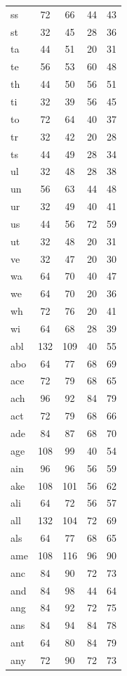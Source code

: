 \documentclass[ms,electronic,twosidetoc,letterpaper,chaptercenter,parttop,lof,lot]{byumsphd}
\begin{document}
\begin{longtable}{| l | c c | c c |}
  ss & 72 & 66 & 44 & 43 \\
  st & 32 & 45 & 28 & 36 \\
  ta & 44 & 51 & 20 & 31 \\
  te & 56 & 53 & 60 & 48 \\
  th & 44 & 50 & 56 & 51 \\
  ti & 32 & 39 & 56 & 45 \\
  to & 72 & 64 & 40 & 37 \\
  tr & 32 & 42 & 20 & 28 \\
  ts & 44 & 49 & 28 & 34 \\
  ul & 32 & 48 & 28 & 38 \\
  un & 56 & 63 & 44 & 48 \\
  ur & 32 & 49 & 40 & 41 \\
  us & 44 & 56 & 72 & 59 \\
  ut & 32 & 48 & 20 & 31 \\
  ve & 32 & 47 & 20 & 30 \\
  wa & 64 & 70 & 40 & 47 \\
  we & 64 & 70 & 20 & 36 \\
  wh & 72 & 76 & 20 & 41 \\
  wi & 64 & 68 & 28 & 39 \\
  abl & 132 & 109 & 40 & 55 \\
  abo & 64 & 77 & 68 & 69 \\
  ace & 72 & 79 & 68 & 65 \\
  ach & 96 & 92 & 84 & 79 \\
  act & 72 & 79 & 68 & 66 \\
  ade & 84 & 87 & 68 & 70 \\
  age & 108 & 99 & 40 & 54 \\
  ain & 96 & 96 & 56 & 59 \\
  ake & 108 & 101 & 56 & 62 \\
  ali & 64 & 72 & 56 & 57 \\
  all & 132 & 104 & 72 & 69 \\
  als & 64 & 77 & 68 & 65 \\
  ame & 108 & 116 & 96 & 90 \\
  anc & 84 & 90 & 72 & 73 \\
  and & 84 & 98 & 44 & 64 \\
  ang & 84 & 92 & 72 & 75 \\
  ans & 84 & 94 & 84 & 78 \\
  ant & 64 & 80 & 84 & 79 \\
  any & 72 & 90 & 72 & 73 \\

\end{longtable}
\end{document}
